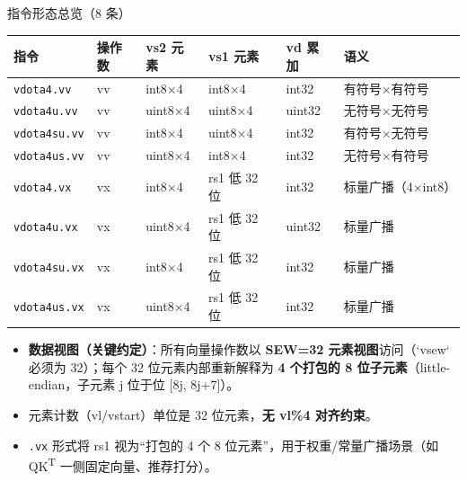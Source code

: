 \documentclass[aspectratio=169]{beamer}
\newcommand{\smalltable}[1]{\par\centering\scriptsize #1\par}
\begin{document}
\begin{frame}{指令形态总览（8 条）}
\smalltable{%
\begin{tabular}{@{}llllll@{}}
\toprule
指令 & 操作数 & vs2 元素 & vs1 元素 & vd 累加 & 语义 \\
\midrule
\texttt{vdota4.vv} & vv & int8×4 & int8×4 & int32 & 有符号×有符号 \\
\texttt{vdota4u.vv} & vv & uint8×4 & uint8×4 & uint32 & 无符号×无符号 \\
\texttt{vdota4su.vv} & vv & int8×4 & uint8×4 & int32 & 有符号×无符号 \\
\texttt{vdota4us.vv} & vv & uint8×4 & int8×4 & int32 & 无符号×有符号 \\
\texttt{vdota4.vx} & vx & int8×4 & rs1 低 32 位 & int32 & 标量广播（4×int8） \\
\texttt{vdota4u.vx} & vx & uint8×4 & rs1 低 32 位 & uint32 & 标量广播 \\
\texttt{vdota4su.vx} & vx & int8×4 & rs1 低 32 位 & int32 & 标量广播 \\
\texttt{vdota4us.vx} & vx & uint8×4 & rs1 低 32 位 & int32 & 标量广播 \\
\bottomrule
\end{tabular}}
\vspace{0.6em}
\begin{itemize}
  \item \textbf{数据视图（关键约定）}：所有向量操作数以 \textbf{SEW=32 元素视图}访问（`vsew` 必须为 32）；每个 32 位元素内部重新解释为 \textbf{4 个打包的 8 位子元素}（little-endian，子元素 j 位于位 [8j, 8j+7]）。
  \item 元素计数（vl/vstart）单位是 32 位元素，\textbf{无 vl\%4 对齐约束}。
  \item \texttt{.vx} 形式将 rs1 视为“打包的 4 个 8 位元素”，用于权重/常量广播场景（如 QK\textsuperscript{T} 一侧固定向量、推荐打分）。
\end{itemize}
\end{frame}
\end{document}
